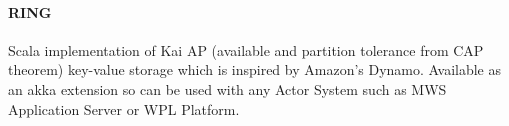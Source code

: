 \paragraph{RING}
Scala implementation of Kai AP (available and partition tolerance from CAP theorem) key-value storage which is inspired by Amazon's Dynamo.
Available as an akka extension so can be used with any Actor System such as MWS Application Server or WPL Platform.

